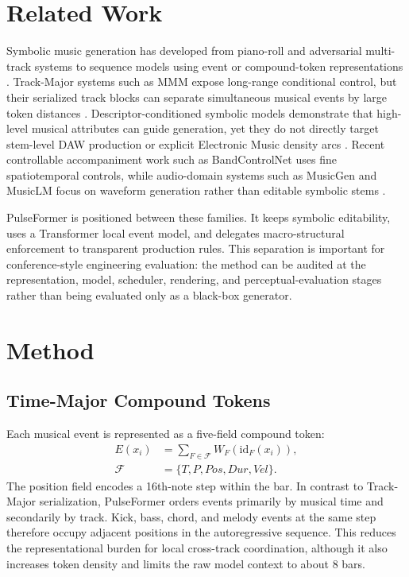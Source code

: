 \documentclass[conference]{conference-latex-template_10-17-19/IEEEtran}
\begin{document}
\section{Related Work}
Symbolic music generation has developed from piano-roll and adversarial multi-track systems to sequence models using event or compound-token representations \cite{dong2018musegan,huang2020remi,hsiao2021compound,zeng2021musicbert}. Track-Major systems such as MMM expose long-range conditional control, but their serialized track blocks can separate simultaneous musical events by large token distances \cite{ens2020mmm}. Descriptor-conditioned symbolic models demonstrate that high-level musical attributes can guide generation, yet they do not directly target stem-level DAW production or explicit Electronic Music density arcs \cite{wu2023musemorphose}. Recent controllable accompaniment work such as BandControlNet uses fine spatiotemporal controls, while audio-domain systems such as MusicGen and MusicLM focus on waveform generation rather than editable symbolic stems \cite{luo2024bandcontrolnet,copet2023simple,agostinelli2023musiclm}.

PulseFormer is positioned between these families. It keeps symbolic editability, uses a Transformer local event model, and delegates macro-structural enforcement to transparent production rules. This separation is important for conference-style engineering evaluation: the method can be audited at the representation, model, scheduler, rendering, and perceptual-evaluation stages rather than being evaluated only as a black-box generator.

\section{Method}
\subsection{Time-Major Compound Tokens}
Each musical event is represented as a five-field compound token:
\begin{equation}
\begin{split}
E(x_i)&=\sum_{F\in\mathcal{F}} W_F(\mathrm{id}_F(x_i)),\\
\mathcal{F}&=\{T,P,Pos,Dur,Vel\}.
\end{split}
\end{equation}
The position field encodes a 16th-note step within the bar. In contrast to Track-Major serialization, PulseFormer orders events primarily by musical time and secondarily by track. Kick, bass, chord, and melody events at the same step therefore occupy adjacent positions in the autoregressive sequence. This reduces the representational burden for local cross-track coordination, although it also increases token density and limits the raw model context to about 8 bars.
\end{document}

